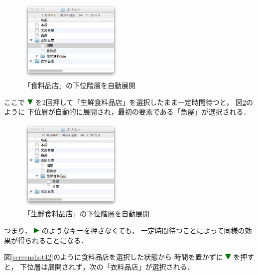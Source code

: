 \documentclass[twoside]{wiss}
\def\figwidth{50mm}
\def\down{ \includegraphics[width=3mm,bb=0 0 36 36]{figures/downtriangle.pdf} }
\def\right{ \includegraphics[width=3mm,bb=0 0 36 36]{figures/righttriangle.pdf} }
\begin{document}
\begin{figure}[H]
\centerline{\includegraphics[width=\figwidth,bb=0 0 344 272]{figures/2387e402f81dbe7917e04df82b0a659c.png}}
\caption{「食料品店」の下位階層を自動展開}
\label{screenshot7}
\end{figure}

\noindent
ここで{\down}を2回押して「生鮮食料品店」を選択したまま一定時間待つと，
図\ref{screenshot8}のように
下位層が自動的に展開され，最初の要素である「魚屋」が選択される．

\begin{figure}[H]
\centerline{\includegraphics[width=\figwidth,bb=0 0 344 304]{figures/1b1955309d3baefda8e1b614cf06df62.png}}
\caption{「生鮮食料品店」の下位階層を自動展開}
\label{screenshot8}
\end{figure}

\noindent
つまり，{\right}のようなキーを押さなくても，
一定時間待つことによって同様の効果が得られることになる．

図\ref{screenshot42}のように食料品店を選択した状態から
時間を置かずに{\down}を押すと，
下位層は展開されず，次の「衣料品店」が選択される．
\end{document}
